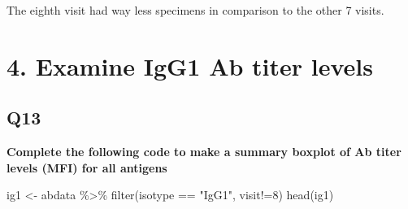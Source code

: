\documentclass[
  letterpaper,
  DIV=11,
  numbers=noendperiod]{scrartcl}
\newenvironment{Shaded}{\begin{snugshade}}{\end{snugshade}}
\newcommand{\DecValTok}[1]{\textcolor[rgb]{0.68,0.00,0.00}{#1}}
\newcommand{\FunctionTok}[1]{\textcolor[rgb]{0.28,0.35,0.67}{#1}}
\newcommand{\NormalTok}[1]{\textcolor[rgb]{0.00,0.23,0.31}{#1}}
\newcommand{\OtherTok}[1]{\textcolor[rgb]{0.00,0.23,0.31}{#1}}
\newcommand{\SpecialCharTok}[1]{\textcolor[rgb]{0.37,0.37,0.37}{#1}}
\newcommand{\StringTok}[1]{\textcolor[rgb]{0.13,0.47,0.30}{#1}}
\begin{document}
The eighth visit had way less specimens in comparison to the other 7
visits.

\hypertarget{examine-igg1-ab-titer-levels}{%
\section{4. Examine IgG1 Ab titer
levels}\label{examine-igg1-ab-titer-levels}}

\hypertarget{q13}{%
\subsection{Q13}\label{q13}}

\textbf{Complete the following code to make a summary boxplot of Ab
titer levels (MFI) for all antigens}

\begin{Shaded}
\begin{Highlighting}[]
\NormalTok{ig1 }\OtherTok{\textless{}{-}}\NormalTok{ abdata }\SpecialCharTok{\%\textgreater{}\%} \FunctionTok{filter}\NormalTok{(isotype }\SpecialCharTok{==} \StringTok{"IgG1"}\NormalTok{, visit}\SpecialCharTok{!=}\DecValTok{8}\NormalTok{)}
\FunctionTok{head}\NormalTok{(ig1)}
\end{Highlighting}
\end{Shaded}
\end{document}
